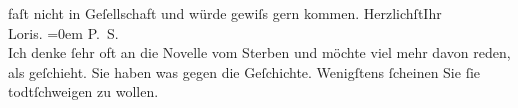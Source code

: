 \begin{ledgroupsized}[t]{13cm}
               faſt nicht in Geſellschaft und würde gewiſs gern kommen.\pend
           \pstart
           Herzlichſt\hspace*{2.5em}Ihr{\\[\baselineskip]}\spacefill\mbox{Loris.}\pend
           \leftskip=0em{}\pstart
           \noindent{}P. S.{\\}Ich denke ſehr oft an die Novelle vom Sterben und möchte viel mehr davon reden, als geſchieht. Sie haben was
                  gegen die Geſchichte. Wenigſtens ſcheinen Sie ſie todtſchweigen zu wollen.\pend
           
         
         \endnumbering{}\end{ledgroupsized}  \newcommand{\dateiname}{L00171}\newcommand{\titel}{Hugo von Hofmannsthal an Arthur Schnitzler, 1. 2. [1893]}\newcommand{\editorInnen}{ Martin Anton Müller und Gerd-Hermann Susen}
      